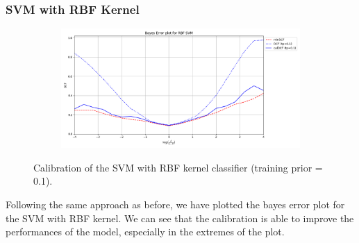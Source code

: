 \documentclass[12pt]{report}
\begin{document}
\subsubsection*{SVM with RBF Kernel}
\begin{figure}[H]
    \centering
    \begin{subfigure}[t]{0.6\textwidth}
        \includegraphics[width=\textwidth]{./plot/calibration/RBF_SVM.png}
    \end{subfigure}
    \caption{Calibration of the SVM with RBF kernel classifier (training prior = 0.1).}
    \label{fig:calibration_SVM}
\end{figure}
\noindent
Following the same approach as before, we have plotted the bayes error plot for the SVM with RBF kernel. We can see that the calibration is able to improve the performances of the model, especially in the extremes of the plot.
\end{document}
